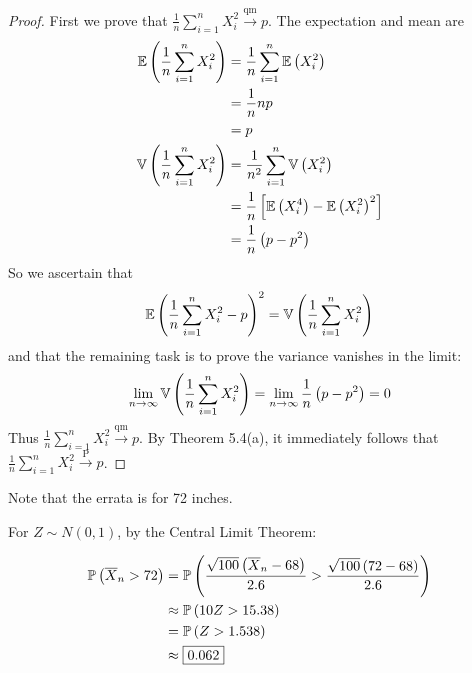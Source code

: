 \documentclass[a4paper]{article}
\begin{document}
\begin{proof}[Proof] 
First we prove that \(\frac{1}{n} \sum_{i=1}^{n} X^{2}_{i} \xrightarrow{\text{qm}} p\). The expectation and mean are
\begin{align*}
	\mathbb{E}\left( \frac{1}{n} \sum_{i=1}^{n} X^{2}_{i} \right) & = \frac{1}{n} \sum_{i=1}^{n} \mathbb{E}\left( X^{2}_{i} \right) \\
	 & = \frac{1}{n} np \\ 
	 & = p \\
	\mathbb{V}\left( \frac{1}{n} \sum_{i=1}^{n} X^{2}_{i} \right) & = \frac{1}{n^{2}} \sum_{i=1}^{n} \mathbb{V}\left( X^{2}_{i} \right) \\
	 & = \frac{1}{n} \left[ \mathbb{E}\left( X^{4}_{i} \right) - \mathbb{E}\left( X^{2}_{i} \right)^{2} \right] \\
	 & = \frac{1}{n} \left( p - p^{2} \right) 
\end{align*}
So we ascertain that 
\[
	\mathbb{E}\left( \frac{1}{n} \sum_{i=1}^{n} X^{2}_{i} - p \right)^{2} = \mathbb{V}\left( \frac{1}{n} \sum_{i=1}^{n} X^{2}_{i} \right)
\]
and that the remaining task is to prove the variance vanishes in the limit:
\[
	\lim_{n \to \infty} \mathbb{V}\left( \frac{1}{n} \sum_{i=1}^{n} X^{2}_{i} \right) = \lim_{n \to \infty} \frac{1}{n} \left( p - p^{2} \right) = 0
\]
Thus \(\frac{1}{n} \sum_{i=1}^{n} X^{2}_{i} \xrightarrow{\text{qm}} p \). By Theorem 5.4(a), it immediately follows that \(\frac{1}{n} \sum_{i=1}^{n} X^{2}_{i} \xrightarrow{\text{ P }} p\).
\end{proof}


Note that the errata is for 72 inches.

For \(Z \sim N \left( 0,1 \right) \), by the Central Limit Theorem:

\begin{align*}
	\mathbb{P}\left( \overline{X}_{n} > 72 \right) & = \mathbb{P}\left( \frac{\sqrt{100} \left( \overline{X}_{n} - 68  \right) }{2.6} > \frac{\sqrt{100} \left( 72 - 68 \right) }{2.6} \right) \\
	 & \approx \mathbb{P}\left( 10 Z > 15.38 \right) \\ 
	 & = \mathbb{P}\left( Z > 1.538 \right) \\
	 & \approx \boxed{0.062}
\end{align*}
\end{document}
